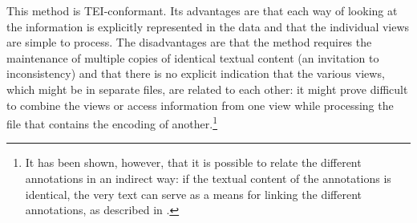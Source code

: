 This method is TEI-conformant. Its advantages are that each way of looking at the information is explicitly represented in the data and that the individual views are simple to process. The disadvantages are that the method requires the maintenance of multiple copies of identical textual content (an invitation to inconsistency) and that there is no explicit indication that the various views, which might be in separate files, are related to each other: it might prove difficult to combine the views or access information from one view while processing the file that contains the encoding of another.\footnote{It has been shown, however, that it is possible to relate the different annotations in an indirect way: if the textual content of the annotations is identical, the very text can serve as a means for linking the different annotations, as described in \cite{NH-BIBL-01}.}
